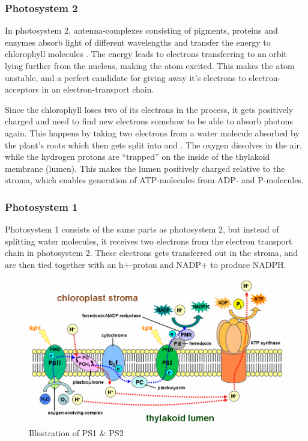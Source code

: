 \subsubsection{Photosystem 2}
In photosystem 2, antenna-complexes consisting of pigments, proteins and enzymes absorb light of different wavelengths and transfer the energy to chlorophyll molecules \citep{bios}. The energy leads to electrons transferring to an orbit lying further from the nucleus, making the atom excited. This makes the atom unstable, and a perfect candidate for giving away it’s electrons to electron-acceptors in an electron-transport chain.

Since the chlorophyll loses two of its electrons in the process, it gets positively charged and need to find new electrons somehow to be able to absorb photons again. This happens by taking two electrons from a water molecule absorbed by the plant’s roots which then gets split into  and  \citep{bios}. The oxygen dissolves in the air, while the hydrogen protons are “trapped” on the inside of the thylakoid membrane (lumen). This makes the lumen positively charged relative to the stroma, which enables generation of ATP-molecules from ADP- and P-molecules. 

\subsubsection{Photosystem 1}
Photosystem 1 consists of the same parts as photosystem 2, but instead of splitting water molecules, it receives two electrons from the electron transport chain in photosystem 2. These electrons gets transferred out in the stroma, and are then tied together with an h+-proton and NADP+ to produce NADPH.

\begin{figure}
\centering
\includegraphics[width=\textwidth]{img/photosynthesis/ps2_ps1.png}
\caption{Illustration of PS1 \& PS2 \citep{wiki:photosystem}}
\label{fig:photosystem}
\end{figure}

